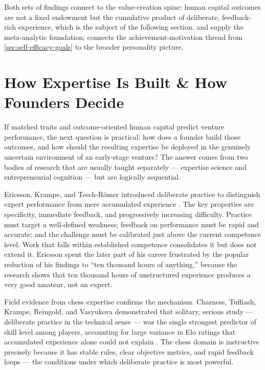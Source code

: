Both sets of findings connect to the value-creation spine: human capital outcomes are not a
fixed endowment but the cumulative product of deliberate, feedback-rich experience, which is
the subject of the following section. \textcite{rauch2007person} and \textcite{unger2011human}
supply the meta-analytic foundation; \textcite{collins2004achievement} connects the
achievement-motivation thread from \cref{sec:self-efficacy-goals} to the broader personality
picture.

\section{How Expertise Is Built \& How Founders Decide}\label{sec:practice-effectuation}

If matched traits and outcome-oriented human capital predict venture performance, the next
question is practical: how does a founder build those outcomes, and how should the resulting
expertise be deployed in the genuinely uncertain environment of an early-stage venture? The
answer comes from two bodies of research that are usually taught separately --- expertise
science and entrepreneurial cognition --- but are logically sequential.

Ericsson, Krampe, and Tesch-R{\"o}mer introduced deliberate practice to distinguish expert
performance from mere accumulated experience \parencite{ericsson1993role}. The key properties
are specificity, immediate feedback, and progressively increasing difficulty. Practice must
target a well-defined weakness; feedback on performance must be rapid and accurate; and the
challenge must be calibrated just above the current competence level. Work that falls within
established competence consolidates it but does not extend it. Ericsson spent the later part
of his career frustrated by the popular reduction of his findings to ``ten thousand hours of
anything,'' because the research shows that ten thousand hours of unstructured experience
produces a very good amateur, not an expert.

Field evidence from chess expertise confirms the mechanism. Charness, Tuffiash, Krampe,
Reingold, and Vasyukova demonstrated that solitary, serious study --- deliberate practice in the
technical sense --- was the single strongest predictor of skill level among players, accounting
for large variance in Elo ratings that accumulated experience alone could not explain
\parencite{charness2005practice}. %
The chess domain is instructive precisely because it has stable rules, clear objective
metrics, and rapid feedback loops --- the conditions under which deliberate practice is most
powerful.

